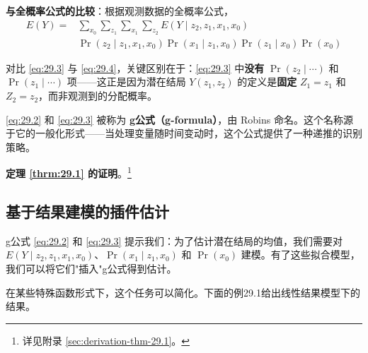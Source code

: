 \textbf{与全概率公式的比较}：根据观测数据的全概率公式，
\[
\begin{aligned}
E(Y) = & \sum_{x_0} \sum_{z_1} \sum_{x_1} \sum_{z_2} E(Y \mid z_2, z_1, x_1, x_0) \\
& \Pr(z_2 \mid z_1, x_1, x_0) \Pr(x_1 \mid z_1, x_0) \Pr(z_1 \mid x_0) \Pr(x_0)
\end{aligned}
\label{eq:29.4}
\tag{29.4}
\]

对比 \ref{eq:29.3} 与 \ref{eq:29.4}，关键区别在于：\ref{eq:29.3} 中\textbf{没有} $\Pr(z_2 \mid \cdots)$ 和 $\Pr(z_1 \mid \cdots)$ 项——这正是因为潜在结局 $Y(z_1, z_2)$ 的定义是\textbf{固定} $Z_1 = z_1$ 和 $Z_2 = z_2$，而非观测到的分配概率。

\ref{eq:29.2} 和 \ref{eq:29.3} 被称为 \textbf{g公式（g-formula）}，由 Robins 命名。这个名称源于它的一般化形式——当处理变量随时间变动时，这个公式提供了一种递推的识别策略。

\textbf{定理 \ref{thrm:29.1} 的证明}。\footnote{详见附录 \cref{sec:derivation-thm-29.1}。}

\subsection{基于结果建模的插件估计}\label{sec:29-3-1}

g公式 \ref{eq:29.2} 和 \ref{eq:29.3} 提示我们：为了估计潜在结局的均值，我们需要对 $E(Y \mid z_2, z_1, x_1, x_0)$、$\Pr(x_1 \mid z_1, x_0)$ 和 $\Pr(x_0)$ 建模。有了这些拟合模型，我们可以将它们"插入"g公式得到估计。

在某些特殊函数形式下，这个任务可以简化。下面的例29.1给出线性结果模型下的结果。

